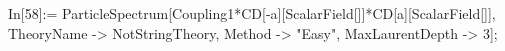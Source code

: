 In[58]:= ParticleSpectrum[Coupling1*CD[-a][ScalarField[]]*CD[a][ScalarField[]], TheoryName -> NotStringTheory, Method -> "Easy", MaxLaurentDepth -> 3]; 